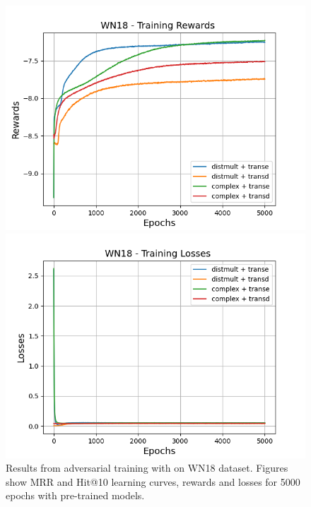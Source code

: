 \begin{figure}[H]
    \begin{minipage}{.5\textwidth}
      \centering
      \includegraphics[width=\linewidth]{figures/results/gan_train/pretrained/random/wn18/gan_train_random_wn18_rewards.png}
    \end{minipage}%
     \begin{minipage}{.5\textwidth}
      \centering
      \includegraphics[width=\linewidth]{figures/results/gan_train/pretrained/random/wn18/gan_train_random_wn18_losses.png}
    \end{minipage}%
    \caption{Results from adversarial training with \origsampling on \textsc{WN18} dataset.
    Figures show MRR and Hit@10 learning curves, rewards and losses for 5000 epochs with pre-trained models.}
    \label{fig:gan_train_pretrained_random_wn18}
\end{figure}
